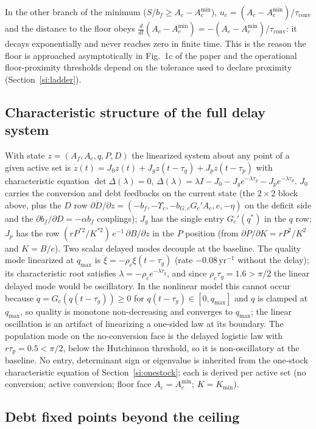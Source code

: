 \documentclass[11pt,a4paper]{article}
\newcommand{\Ups}{\Upsilon_c}
\newcommand{\Acmin}{A_c^{\min}}
\newcommand{\tconv}{\tau_{\mathrm{conv}}}
\begin{document}
In the other branch of the minimum ($S/b_f\ge A_c-\Acmin$), $u_c=(A_c-\Acmin)/\tconv$ and the distance to the floor obeys $\frac{d}{dt}(A_c-\Acmin)=-(A_c-\Acmin)/\tconv$: it decays exponentially and never reaches zero in finite time. This is the reason the floor is approached asymptotically in Fig.~1c of the paper and the operational floor-proximity thresholds depend on the tolerance used to declare proximity (Section~\ref{si:ladder}).

\subsection{Characteristic structure of the full delay system}\label{si:char}

With state $z=(A_f,A_c,q,P,D)$ the linearized system about any point of a given active set is $\dot z(t)=J_0z(t)+J_gz(t-\tau_g)+J_pz(t-\tau_p)$ with characteristic equation $\det\Delta(\lambda)=0$, $\Delta(\lambda)=\lambda I-J_0-J_ge^{-\lambda\tau_g}-J_pe^{-\lambda\tau_p}$. $J_0$ carries the conversion and debt feedbacks on the current state (the $2\times2$ block above, plus the $D$ row $\partial\dot D/\partial z=(-b_f,-\Ups,-b_{G,c}G_c'A_c,e,-\eta)$ on the deficit side and the $\partial b_f/\partial D=-\alpha b_f$ couplings); $J_g$ has the single entry $G_c'(q^*)$ in the $q$ row; $J_p$ has the row $(rP^{*2}/K^{*2})\,e^{-1}\,\partial B/\partial z$ in the $P$ position (from $\partial\dot P/\partial K=rP^2/K^2$ and $K=B/e$). Two scalar delayed modes decouple at the baseline. The quality mode linearized at $q_{\max}$ is $\dot\xi=-\rho_c\xi(t-\tau_g)$ (rate $-0.08\,\mathrm{yr}^{-1}$ without the delay); its characteristic root satisfies $\lambda=-\rho_ce^{-\lambda\tau_g}$, and since $\rho_c\tau_g=1.6>\pi/2$ the linear delayed mode would be oscillatory. In the nonlinear model this cannot occur because $\dot q=G_c(q(t-\tau_g))\ge0$ for $q(t-\tau_g)\in[0,q_{\max}]$ and $q$ is clamped at $q_{\max}$, so quality is monotone non-decreasing and converges to $q_{\max}$; the linear oscillation is an artifact of linearizing a one-sided law at its boundary. The population mode on the no-conversion face is the delayed logistic law with $r\tau_p=0.5<\pi/2$, below the Hutchinson threshold, so it is non-oscillatory at the baseline. No entry, determinant sign or eigenvalue is inherited from the one-stock characteristic equation of Section~\ref{si:onestock}; each is derived per active set (no conversion; active conversion; floor face $A_c=\Acmin$; $K=K_{\min}$).

\subsection{Debt fixed points beyond the ceiling}\label{si:debt}
\end{document}

